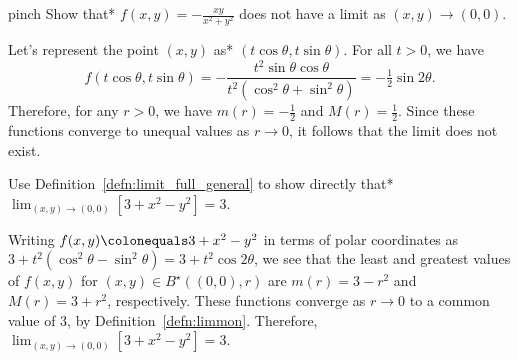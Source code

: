 \documentclass[prettycode,shellescape]{watsonbook}
\begin{document}
\begin{example}{}{pinch}
  Show that* $f(x,y) = -\frac{xy}{x^2 + y^2}$ does not have a limit as
  $(x,y) \to (0,0)$. 
\end{example}

\begin{solution}
  Let's represent the point $(x,y)$ as*  $(t \cos \theta, t\sin \theta)$. For all $t > 0$,
  we have
  \[
    f(t\cos\theta, t\sin \theta) = -\frac{ t^2 \sin \theta \cos
      \theta}{t^2(\cos^2 \theta + \sin^2 \theta)} = -\tfrac{1}{2} \sin
    2\theta. 
  \]
  Therefore, for any $r > 0$, we have $m(r) = -\tfrac{1}{2}$ and $M(r) =
  \tfrac{1}{2}$. Since these functions converge to unequal values as
  $r \to 0$, it follows that the limit does not exist. 
\end{solution}

\begin{example}{}{}
  Use Definition~\ref{defn:limit_full_general} to show directly that*
  $\displaystyle{\lim_{(x,y) \to (0,0)} \left[3 + x^2 - y^2\right] =
    3}$.
\end{example}

\begin{solution}
  Writing $f(x,y) \colonequals 3 + x^2 - y^2$ in terms of polar
  coordinates as
  $3 + t^2(\cos^2 \theta - \sin^2 \theta) = 3 +t^2 \cos2\theta$, we
  see that the least and greatest values of $f(x,y)$ for
  $(x,y) \in B^\star((0,0),r)$ are $m(r) = 3-r^2$ and
  $M(r) = 3 + r^2$, respectively. These functions converge as $r\to 0$
  to a common value of $3$, by
  Definition~\ref{defn:limmon}. Therefore,
  $\displaystyle{\lim_{(x,y) \to (0,0)} \left[3 + x^2 - y^2\right] =
    3}$.
\end{solution}
\end{document}
